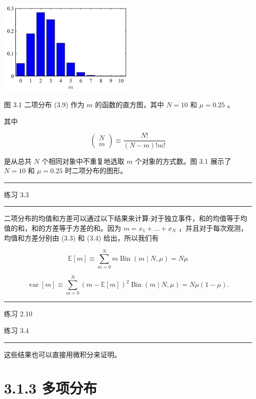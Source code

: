 \documentclass[10pt]{article}
\newcommand{\HRule}{\begin{center}\rule{0.9\linewidth}{0.2mm}\end{center}}
\begin{document}
\begin{center}
\includegraphics[max width=0.5\textwidth]{images/0194e279-9b28-703a-88f4-c3ac21e2010d_87_901_361_636_446_0.jpg}
\end{center}
\hspace*{3em} 

图 3.1 二项分布 (3.9) 作为 \(m\) 的函数的直方图，其中 \(N = {10}\) 和 \(\mu  = {0.25}\) 。

其中

\[
\left( \begin{array}{l} N \\  m \end{array}\right)  \equiv  \frac{N!}{\left( {N - m}\right) !m!} \tag{3.10}
\]

是从总共 \(N\) 个相同对象中不重复地选取 \(m\) 个对象的方式数。图 3.1 展示了 \(N = {10}\) 和 \(\mu  = {0.25}\) 时二项分布的图形。

\HRule

练习 3.3

\HRule

二项分布的均值和方差可以通过以下结果来计算:对于独立事件，和的均值等于均值的和，和的方差等于方差的和。因为 \(m = {x}_{1} + \ldots  + {x}_{N}\) ，并且对于每次观测，均值和方差分别由 (3.3) 和 (3.4) 给出，所以我们有

\[
\mathbb{E}\left\lbrack  m\right\rbrack   \equiv  \mathop{\sum }\limits_{{m = 0}}^{N}m\operatorname{Bin}\left( {m \mid  N,\mu }\right)  = {N\mu } \tag{3.11}
\]

\[
\operatorname{var}\left\lbrack  m\right\rbrack   \equiv  \mathop{\sum }\limits_{{m = 0}}^{N}{\left( m - \mathbb{E}\left\lbrack  m\right\rbrack  \right) }^{2}\operatorname{Bin}\left( {m \mid  N,\mu }\right)  = {N\mu }\left( {1 - \mu }\right) . \tag{3.12}
\]

\HRule

练习 2.10

练习 3.4

\HRule

这些结果也可以直接用微积分来证明。

\section*{3.1.3 多项分布}
\end{document}
